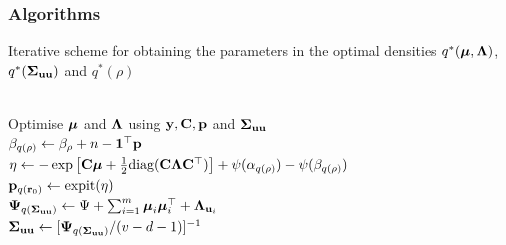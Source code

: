 \documentclass{beamer}
\begin{document}
\begin{frame}
	\frametitle{Algorithms}

	\begin{algorithm}[H]
		\caption[Algorithm 1]{Iterative scheme for obtaining the parameters in the
			optimal densities $q^*({\boldsymbol \mu}, {\boldsymbol \Lambda})$, $q^*({\boldsymbol \Sigma}_{{\bf u} {\bf u}})$ and $q^*(\rho)$}
		\label{alg:algorithm_one}
		\begin{algorithmic}
			 \\[1ex]
			\STATE Optimise ${\boldsymbol \mu}$ and ${\boldsymbol \Lambda}$ using ${\bf y}, {\bf C}, {\bf p}$ and ${\boldsymbol \Sigma}_{{\bf u} {\bf u}}$ \\[1ex]
			\STATE $\beta_{q(\rho)} \leftarrow \beta_\rho + n - {\bf 1}^\top{\bf p}$ \\[1ex]
			\STATE $\eta \leftarrow -\exp \left [ {\bf C} {\boldsymbol \mu} + \tfrac{1}{2} \text{diag}{({\bf C}{\boldsymbol\Lambda}{\bf C}^\top)} \right ] + \psi{(\alpha_{q{(\rho)}})} - \psi{(\beta_{q{(\rho)}})}$ \\[1ex]
				\STATE ${\bf p}_{q({\bf r}_0)} \leftarrow \text{expit} (\eta)$ \\[1ex]
				\STATE ${\boldsymbol \Psi}_{q({\boldsymbol \Sigma}_{{\bf u} {\bf u}})} \leftarrow \Psi + \sum_{i=1}^m {\boldsymbol \mu}_i {\boldsymbol \mu}_i^\top + {\boldsymbol \Lambda}_{{{\bf u}}_i}$ \\[1ex]
				\STATE ${\boldsymbol \Sigma}_{{\bf u}{\bf u}} \leftarrow [{\boldsymbol \Psi}_{q({\boldsymbol \Sigma}_{{\bf u} {\bf u}})}/(v - d - 1)]^{-1}$
				\ENDWHILE
			\end{algorithmic}
		\end{algorithm}
		
	\end{frame}
	
	
\end{document}
